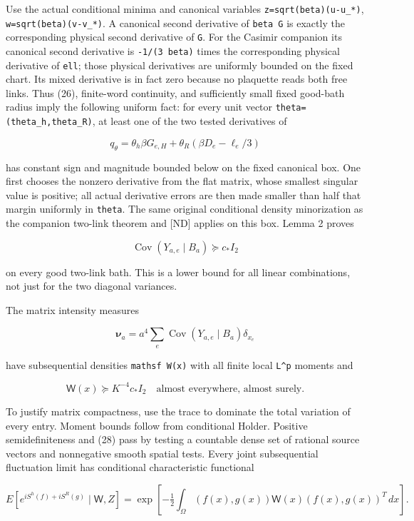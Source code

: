 \documentclass[
  11pt,
]{article}
\begin{document}
Use the actual conditional minima and canonical variables
\texttt{z=sqrt(beta)(u-u\_*)}, \texttt{w=sqrt(beta)(v-v\_*)}. A
canonical second derivative of \texttt{beta\ G} is exactly the
corresponding physical second derivative of \texttt{G}. For the Casimir
companion its canonical second derivative is \texttt{-1/(3\ beta)} times
the corresponding physical derivative of \texttt{ell}; those physical
derivatives are uniformly bounded on the fixed chart. Its mixed
derivative is in fact zero because no plaquette reads both free links.
Thus (26), finite-word continuity, and sufficiently small fixed
good-bath radius imply the following uniform fact: for every unit vector
\texttt{theta=(theta\_h,theta\_R)}, at least one of the two tested
derivatives of

\[
 q_\theta=\theta_h\beta G_{e,H}
          +\theta_R(\beta D_e-\ell_e/3)
\]

has constant sign and magnitude bounded below on the fixed canonical
box. One first chooses the nonzero derivative from the flat matrix,
whose smallest singular value is positive; all actual derivative errors
are then made smaller than half that margin uniformly in \texttt{theta}.
The same original conditional density minorization as the companion
two-link theorem and [ND] applies on this box. Lemma 2 proves

\[
 \operatorname{Cov}(Y_{a,e}\mid B_a)\succeq c_* I_2
 \tag{27}
\]

on every good two-link bath. This is a lower bound for all linear
combinations, not just for the two diagonal variances.

The matrix intensity measures

\[
 \boldsymbol{\nu}_a=a^4\sum_e\operatorname{Cov}(Y_{a,e}\mid B_a)\delta_{x_e}
\]

have subsequential densities \texttt{mathsf\ W(x)} with all finite local
\texttt{L\^{}p} moments and

\[
 \mathsf W(x)\succeq K^{-4}c_*I_2
 \quad\text{almost everywhere, almost surely}.
 \tag{28}
\]

To justify matrix compactness, use the trace to dominate the total
variation of every entry. Moment bounds follow from conditional Holder.
Positive semidefiniteness and (28) pass by testing a countable dense set
of rational source vectors and nonnegative smooth spatial tests. Every
joint subsequential fluctuation limit has conditional characteristic
functional

\[
 E\left[e^{iS^h(f)+iS^R(g)}\mid\mathsf W,Z\right]
 =\exp\left[-\tfrac12\int_\Omega
       (f(x),g(x))\mathsf W(x)(f(x),g(x))^T\,dx\right].
 \tag{29}
\]
\end{document}
